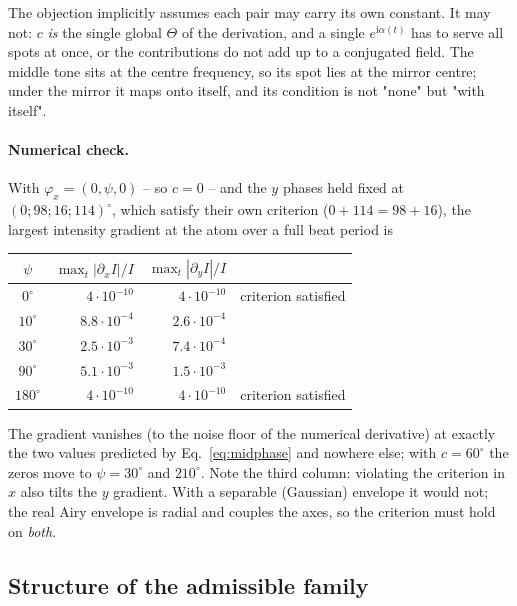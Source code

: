\documentclass[11pt,a4paper]{article}
\begin{document}
The objection implicitly assumes each pair may carry its own constant. It may
not: $c$ \emph{is} the single global $\Theta$ of the derivation, and a single
$e^{\mathrm{i}\alpha(t)}$ has to serve all spots at once, or the
contributions do not add up to a conjugated field. The middle tone sits at
the centre frequency, so its spot lies at the mirror centre; under the mirror
it maps onto itself, and its condition is not "none" but "with itself".

\paragraph{Numerical check.} With $\varphi_x = (0,\psi,0)$ -- so $c=0$ -- and
the $y$ phases held fixed at $(0;98;16;114)^\circ$, which satisfy their own
criterion ($0+114 = 98+16$), the largest intensity gradient at the atom over
a full beat period is

\begin{center}
\begin{tabular}{crrl}
  \toprule
  $\psi$ & $\max_t|\partial_x I|/I$ & $\max_t|\partial_y I|/I$ & \\
  \midrule
  $0^\circ$   & $4\cdot10^{-10}$ & $4\cdot10^{-10}$ & criterion satisfied\\
  $10^\circ$  & $8.8\cdot10^{-4}$ & $2.6\cdot10^{-4}$ & \\
  $30^\circ$  & $2.5\cdot10^{-3}$ & $7.4\cdot10^{-4}$ & \\
  $90^\circ$  & $5.1\cdot10^{-3}$ & $1.5\cdot10^{-3}$ & \\
  $180^\circ$ & $4\cdot10^{-10}$ & $4\cdot10^{-10}$ & criterion satisfied\\
  \bottomrule
\end{tabular}
\end{center}

\noindent The gradient vanishes (to the noise floor of the numerical
derivative) at exactly the two values predicted by
Eq.~\eqref{eq:midphase} and nowhere else; with $c = 60^\circ$ the zeros move
to $\psi = 30^\circ$ and $210^\circ$. Note the third column: violating the
criterion in $x$ also tilts the $y$ gradient. With a separable (Gaussian)
envelope it would not; the real Airy envelope is radial and couples the axes,
so the criterion must hold on \emph{both}.

\subsection{Structure of the admissible family}
\end{document}
